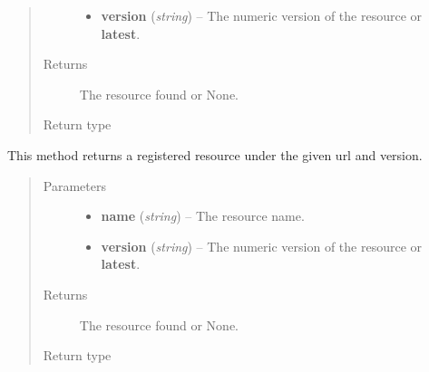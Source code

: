 \documentclass[letterpaper,10pt,english]{sphinxmanual}
\begin{document}
\begin{fulllineitems}
\begin{fulllineitems}
\begin{quote}
\begin{description}
\begin{itemize}
\item {} 
\textbf{version} (\emph{string}) -- The numeric version of the resource or \textbf{latest}.

\end{itemize}

\item[{Returns}] \leavevmode
The resource found or None.

\item[{Return type}] \leavevmode
{\hyperref[features/roa/technical_summary:fantastico.roa.resource_decorator.Resource]{}}

\end{description}\end{quote}

\end{fulllineitems}


\begin{fulllineitems}
\label{features/roa/technical_summary:fantastico.roa.resources_registry.ResourcesRegistry.find_by_url}
This method returns a registered resource under the given url and version.
\begin{quote}\begin{description}
\item[{Parameters}] \leavevmode\begin{itemize}
\item {} 
\textbf{name} (\emph{string}) -- The resource name.

\item {} 
\textbf{version} (\emph{string}) -- The numeric version of the resource or \textbf{latest}.

\end{itemize}

\item[{Returns}] \leavevmode
The resource found or None.

\item[{Return type}] \leavevmode
{\hyperref[features/roa/technical_summary:fantastico.roa.resource_decorator.Resource]{}}

\end{description}\end{quote}

\end{fulllineitems}


\end{fulllineitems}
\end{document}
